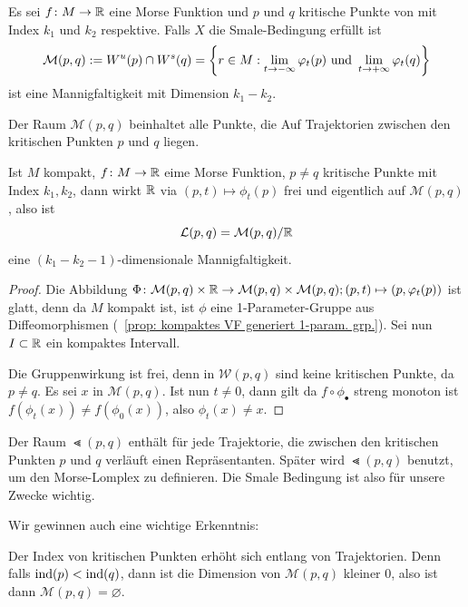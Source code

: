 \begin{prop}
    Es sei $f \colon M \to { \mathbb R }$ eine Morse Funktion und $p$ und $q$ kritische Punkte von mit Index $k_1$
    und $k_2$ respektive. Falls $X$ die Smale-Bedingung erfüllt ist
    \[ \mathcal{M} (p, q) := { W^u } (p) \cap { W^s } (q) = 
        \left\{ r \in M : \lim_{t \to - \infty} \varphi_t(p) \text{ und } 
        \lim_{t \to + \infty} \varphi_t(q) \right\} \]
    ist eine Mannigfaltigkeit mit Dimension $k_1 - k_2$.
\end{prop}

Der Raum $\mathcal{M} (p, q)$ beinhaltet alle Punkte, die Auf Trajektorien zwischen den kritischen
Punkten $p$ und $q$ liegen. 


\begin{prop}
    Ist $M$ kompakt, $f \colon M \to { \mathbb R }$ eime Morse Funktion, $p \neq q$ kritische Punkte mit Index
    $k_1, k_2$, dann wirkt ${ \mathbb R }$ via $(p, t) \mapsto \phi_t(p)$ frei und eigentlich auf 
    $\mathcal{M} (p, q)$, also ist
    \[ { \mathcal{L} } (p, q) = \mathcal{M}(p, q)/{ \mathbb R } \]
    eine $(k_1 - k_2 - 1)$-dimensionale Mannigfaltigkeit.
\end{prop}

\begin{proof}
    Die Abbildung 
    $\Phi \colon \mathcal{M} (p , q) \times { \mathbb R } \to \mathcal{M} (p, q) \times \mathcal{M} (p,q) ; 
    (p, t) \mapsto (p, \varphi_t(p))$ ist glatt, denn da $M$ kompakt ist, ist $\phi$ eine 
    1-Parameter-Gruppe aus Diffeomorphismen (~\ref{prop: kompaktes VF generiert 1-param. grp.}). 
    Sei nun $I \subset { \mathbb R }$ ein kompaktes Intervall. 

    Die Gruppenwirkung ist frei, denn in $\mathcal{W} (p, q)$
    sind keine kritischen Punkte, da $p \neq q$. Es sei $x$ in $\mathcal{M} (p, q)$. 
    Ist nun $t \neq 0$, dann gilt da $f \circ \phi_{\bullet}$ streng monoton ist 
    $f(\phi_t(x)) \neq f(\phi_0(x))$, also $\phi_t(x) \neq x$.
\end{proof}

Der Raum $\Lt (p, q)$ enthält für jede Trajektorie, die zwischen den kritischen Punkten $p$ und $q$ 
verläuft einen Repräsentanten. Später wird $\Lt (p, q)$ benutzt, um den Morse-Lomplex zu definieren.
Die Smale Bedingung ist also für unsere Zwecke wichtig. 

Wir gewinnen auch eine wichtige Erkenntnis: 

\begin{corollary}
    Der Index von kritischen Punkten erhöht sich entlang von Trajektorien. Denn falls 
    ${ \operatorname{ind} } (p) < { \operatorname{ind} } (q)$, dann ist die Dimension von $\mathcal{M} (p, q)$
    kleiner $0$, also ist dann $\mathcal{M} (p, q) = \varnothing$.
\end{corollary}

